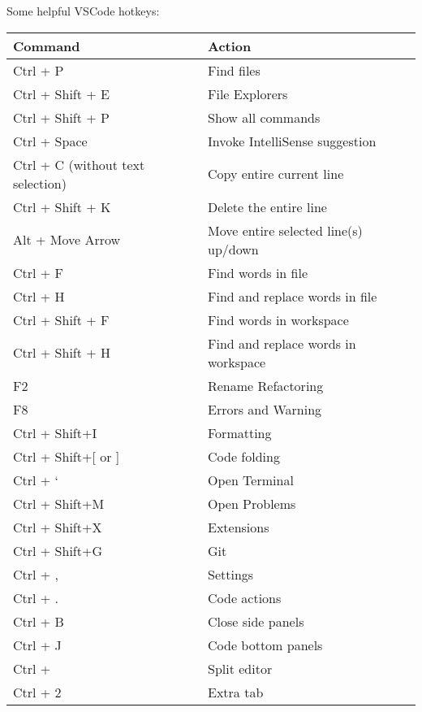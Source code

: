 Some helpful VSCode hotkeys:
\begin{center}
\begin{tabular}{|l|l|}
	\hline	
	Command	& Action \\ [0.5ex] \hline\hline
	Ctrl + P & Find files \\
	Ctrl + Shift + E & File Explorers \\
	Ctrl + Shift + P & Show all commands \\
	Ctrl + Space & Invoke IntelliSense suggestion \\
	Ctrl + C (without text selection) & Copy entire current line \\
	Ctrl + Shift + K & Delete the entire line                      \\
	Alt + Move Arrow & Move entire selected line(s) up/down       \\
	Ctrl + F & Find words in file                                \\
	Ctrl + H & Find and replace words in file                    \\
	Ctrl + Shift + F & Find words in workspace                     \\
	Ctrl + Shift + H & Find and replace words in workspace         \\
	F2 & Rename Refactoring                                    \\
	F8 & Errors and Warning                                    \\
	Ctrl + Shift+I & Formatting                                   \\
	Ctrl + Shift+[ or ] & Code folding                           \\
	Ctrl + ` & Open Terminal                                   \\
	Ctrl + Shift+M & Open Problems                               \\
	Ctrl + Shift+X & Extensions                                  \\
	Ctrl + Shift+G & Git                                         \\
	Ctrl + , & Settings                                          \\
	Ctrl + . & Code actions                                      \\
	Ctrl + B & Close side panels                                 \\
	Ctrl + J & Code bottom panels                                \\
	Ctrl + \ & Split editor                                      \\
	Ctrl + 2 & Extra tab \\ [1ex] \hline
\end{tabular}
\end{center}

